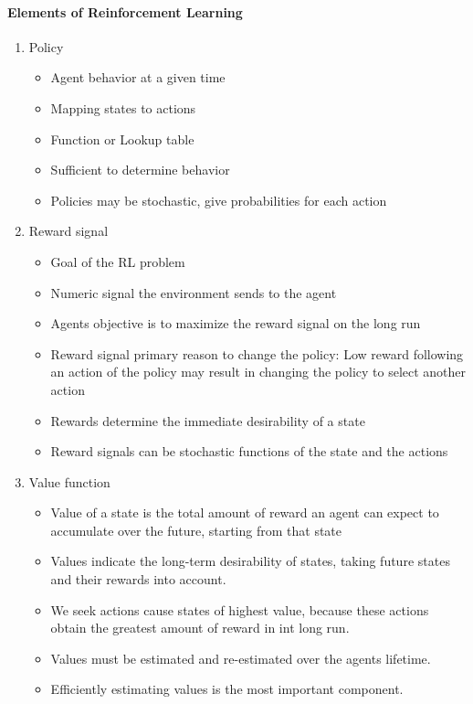 \documentclass[a4paper, twoside, 12pt]{article}
\begin{document}
\paragraph{Elements of Reinforcement Learning}
\label{sec:org6bf5b8e}
\begin{enumerate}
\item Policy
\label{sec:org3b64b98}
\begin{itemize}
\item Agent behavior at a given time
\item Mapping states to actions
\item Function or Lookup table
\item Sufficient to determine behavior
\item Policies may be stochastic, give probabilities for each action
\end{itemize}
\item Reward signal
\label{sec:org1f9e392}
\begin{itemize}
\item Goal of the RL problem
\item Numeric signal the environment sends to the agent
\item Agents objective is to maximize the reward signal on the long run
\item Reward signal primary reason to change the policy: Low reward following an
action of the policy may result in changing the policy to select another action
\item Rewards determine the immediate desirability of a state
\item Reward signals can be stochastic functions of the state and the actions
\end{itemize}
\item Value function
\label{sec:org99ffa3d}
\begin{itemize}
\item Value of a state is the total amount of reward an agent can expect to
accumulate over the future, starting from that state
\item Values indicate the long-term desirability of states, taking future states and
their rewards into account.
\item We seek actions cause states of highest value, because these actions obtain
the greatest amount of reward in int long run.
\item Values must be estimated and re-estimated over the agents lifetime.
\item Efficiently estimating values is the most important component.

\end{itemize}
\end{enumerate}
\end{document}
